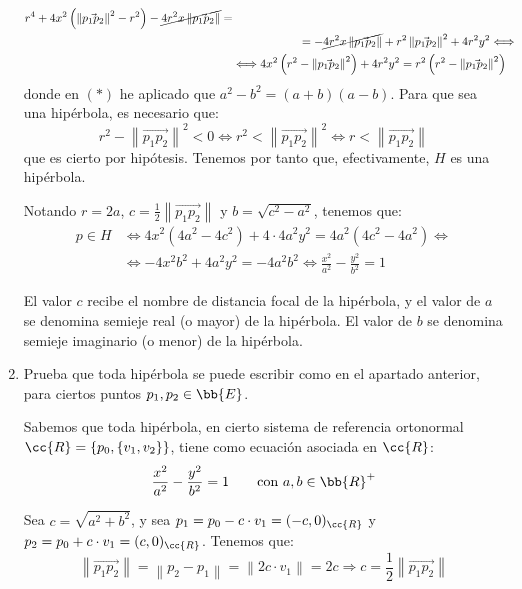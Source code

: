 \begin{ejercicio}
\begin{enumerate}
\begin{align*}
        r^4 + 4x^2\left(\left\|\vec{p_1p_2}\right\|^2-r^2\right) -\cancel{4r^2x\left\|\vec{p_1p_2}\right\|} =\\&\hspace{2cm}= - \cancel{4r^2x\left\|\vec{p_1p_2}\right\|} +r^2\left\|\vec{p_1p_2}\right\|^2 + 4r^2y^2 \Longleftrightarrow \\ & \Longleftrightarrow
        4x^2\left(r^2 - \left\|\vec{p_1p_2}\right\|^2\right) + 4r^2y^2 = r^2\left(r^2 - \left\|\vec{p_1p_2}\right\|^2\right)
    \end{align*}
    donde en $(\ast)$ he aplicado que $a^2-b^2=(a+b)(a-b)$. Para que sea una hipérbola, es necesario que:
    \begin{equation*}
        r^2 - \left\|\vec{p_1p_2}\right\|^2 < 0 \Longleftrightarrow
        r^2 < \left\|\vec{p_1p_2}\right\|^2 \Longleftrightarrow
        r < \left\|\vec{p_1p_2}\right\|
    \end{equation*}
    que es cierto por hipótesis. Tenemos por tanto que, efectivamente, $H$ es una hipérbola.

    Notando $r=2a$, $c=\frac{1}{2}\left\|\vec{p_1p_2}\right\|$ y $b=\sqrt{c^2-a^2}$, tenemos que:
    \begin{align*}
        p\in H &\Longleftrightarrow 4x^2\left(4a^2 - 4c^2\right) + 4\cdot 4a^2y^2 = 4a^2(4c^2 - 4a^2) \Longleftrightarrow \\ & \Longleftrightarrow
        -4x^2b^2 + 4a^2y^2 = -4a^2b^2 \Longleftrightarrow
        \frac{x^2}{a^2} - \frac{y^2}{b^2} = 1
    \end{align*}

    El valor $c$ recibe el nombre de distancia focal de la hipérbola, y el valor de $a$ se denomina semieje real (o mayor) de la hipérbola.
    El valor de $b$ se denomina semieje imaginario (o menor) de la hipérbola.

    \item Prueba que toda hipérbola se puede escribir como en el apartado anterior, para ciertos puntos $p_1, p_2 \in \bb{E}$.
    
    Sabemos que toda hipérbola, en cierto sistema de referencia ortonormal $\cc{R}=\{p_0, \{v_1, v_2\}\}$, tiene como ecuación asociada en $\cc{R}$:
    \begin{equation*}
        \frac{x^2}{a^2} - \frac{y^2}{b^2} = 1 \qquad \text{con } a,b\in \bb{R}^+
    \end{equation*}

    Sea $c=\sqrt{a^2+b^2}$, y sea $p_1 = p_0 - c\cdot v_1=(-c,0)_{\cc{R}}$ y $p_2 = p_0  +c\cdot v_1=(c,0)_{\cc{R}}$. Tenemos que:
    \begin{equation*}
        \left\|\vec{p_1p_2}\right\| = \left\|p_2 - p_1\right\| = \left\|2c\cdot v_1\right\|= 2c \Longrightarrow c = \frac{1}{2}\left\|\vec{p_1p_2}\right\|
    \end{equation*}


\end{enumerate}
\end{ejercicio}

